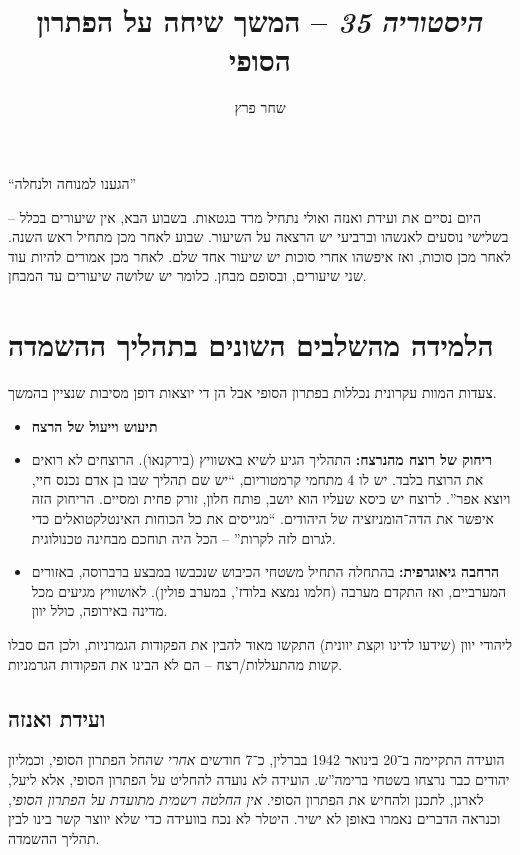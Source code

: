\documentclass[]{article}
\author{שחר פרץ}
\title{\textit{היסטוריה 35} – המשך שיחה על הפתרון הסופי}
\theoremstyle{definition}
\begin{document}
	\maketitle
	``הגענו למנוחה ולנחלה''
	
	היום נסיים את ועידת ואנזה ואולי נתחיל מרד בגטאות. בשבוע הבא, אין שיעורים בכלל – בשלישי נוסעים לאנשהו וברביעי יש הרצאה על השיעור. שבוע לאחר מכן מתחיל ראש השנה. לאחר מכן סוכות, ואז איפשהו אחרי סוכות יש שיעור אחד שלם. לאחר מכן אמורים להיות עוד שני שיעורים, ובסופם מבחן. כלומר יש שלושה שיעורים עד המבחן. 
	
	\section{הלמידה מהשלבים השונים בתהליך ההשמדה}
	צעדות המוות עקרונית נכללות בפתרון הסופי אבל הן די יוצאות דופן מסיבות שנציין בהמשך. 
	\begin{itemize}
		\item \textbf{תיעוש וייעול של הרצח}
		\item \textbf{ריחוק של רוצח מהנרצח: }התהליך הגיע לשיא באשוויץ (בירקנאו). הרוצחים לא רואים את הרוצח בלבד. יש לו 4 מתחמי קרמטוריום, ``יש שם תהליך שבו בן אדם נכנס חיי, ויוצא אפר''. לרוצח יש כיסא שעליו הוא יושב, פותח חלון, זורק פחית ומסיים. הריחוק הזה איפשר את הדה־הומניזציה של היהודים. ``מגייסים את כל הכוחות האינטלקטואלים כדי לגרום לזה לקרות'' – הכל היה תוחכם מבחינה טכנולוגית. 
		\item \textbf{הרחבה גיאוגרפית: }בהתחלה התחיל משטחי הכיבוש שנכבשו במבצע ברברוסה, באזורים המערביים, ואז התקדם מערבה (חלמו נמצא בלודז', במערב פולין). לאושוויץ מגיעים מכל מדינה באירופה, כולל יוון. 
	\end{itemize}
	
	ליהודי יוון (שידעו לדינו וקצת יוונית) התקשו מאוד להבין את הפקודות הגמרניות, ולכן הם סבלו קשות מהתעללות/רצח – הם לא הבינו את הפקודות הגרמניות. 
	
	\subsection{ועידת ואנזה}
	הועידה התקיימה ב־20 בינואר 1942 בברלין, כ־7 חודשים \textit{אחרי} שהחל הפתרון הסופי, וכמליון יהודים כבר נרצחו בשטחי ברימה''ש. הועידה \textit{לא} נועדה להחליט על הפתרון הסופי, אלא ליעל, לארגן, לתכנן ולהחיש את הפתרון הסופי. \textit{אין החלטה רשמית מתועדת על הפתרון הסופי}, וכנראה הדברים נאמרו באופן לא ישיר. היטלר לא נכח בוועידה כדי שלא יווצר קשר בינו לבין תהליך ההשמדה. 
	
\end{document}
